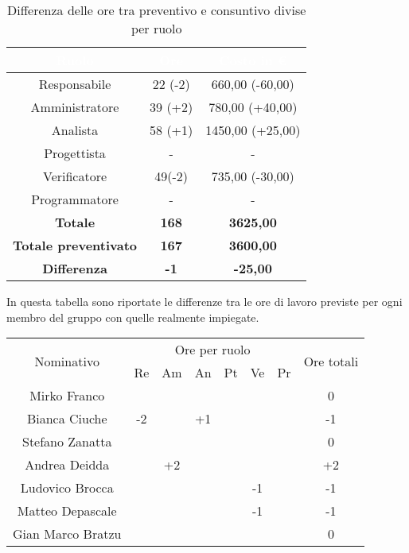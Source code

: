 \begin{flushleft}
	\begin{table}[H]
		\begin{center}
			\begin{tabular}{ccc}
				\rowcolor{coolblack}
				\hline
				\textcolor{white}{Ruolo} & \textcolor{white}{Ore} & \textcolor{white}{Costo in \euro}\\
				\hline
				Responsabile   & 22 (-2)  &  660,00 (-60,00) 	\\ 
				Amministratore & 39 (+2)  &  780,00 (+40,00) 	\\ 
				Analista       & 58 (+1)  &  1450,00 (+25,00)   	\\ 
				Progettista    & -  	 &  - 					\\ 
				Verificatore   & 49(-2)  &  735,00 (-30,00) 	\\ 
				Programmatore  & -       &  -    		 		\\ \hline
				\textbf{Totale}& \textbf{168} & \textbf{3625,00}	\\ \hline 
				\textbf{Totale preventivato}& \textbf{167} & \textbf{3600,00}\\ \hline 
				\textbf{Differenza}& \textbf{-1} & \textbf{-25,00 }	\\ \hline  
			\end{tabular}
			\caption{Differenza delle ore tra preventivo e consuntivo divise per ruolo} 
		\end{center}
	\end{table}
\newpage
    In questa tabella  sono riportate le differenze tra le ore di lavoro previste per ogni membro del gruppo con quelle realmente impiegate.
       \begin{table}[H]
 	\begin{center}
 		\begin{tabularx}{\textwidth}{|c|cccccc|c|}
 			
 			\hline
 			\multirow{2}{*}{Nominativo} & \multicolumn{6}{c|}{Ore per ruolo} & \multirow{2}{*}{Ore totali} \\ \cline{2-7}
 			& Re & Am & An & Pt & Ve & Pr &      \\ \hline
 			\endhead
 			Mirko Franco       &   &    &  &    &  &  & 0    \\ \hline
 			Bianca Ciuche      & -2 &  & +1 &    &  &   & -1       \\ \hline
 			Stefano Zanatta    &   &  &  &  &   &   &    0   \\ \hline
 			Andrea Deidda      &   & +2 &   &   &  &   &  +2  		\\ \hline
 			Ludovico Brocca    &   &  &  &  & -1 &   & -1       \\ \hline
 			Matteo Depascale   &   &  &   &   &  -1 &  & -1  		\\ \hline
 			Gian Marco Bratzu  &   &  &   &   &  &   & 0        \\ \hline
 			

\end{tabularx}
\end{center}
\end{table}
\end{flushleft}
